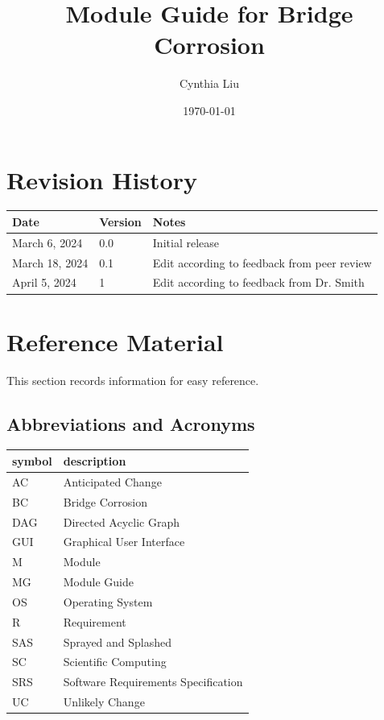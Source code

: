 \documentclass[12pt, titlepage]{article}
\begin{document}
\title{Module Guide for Bridge Corrosion} 
\author{Cynthia Liu}
\date{\today}

\maketitle


\section{Revision History}

\begin{tabularx}{\textwidth}{p{3cm}p{2cm}X}
\toprule {\bf Date} & {\bf Version} & {\bf Notes}\\
\midrule
March 6, 2024 & 0.0 & Initial release\\
March 18, 2024 & 0.1 & Edit according to feedback from peer review \\
April 5, 2024 & 1 & Edit according to feedback from Dr. Smith\\
\bottomrule
\end{tabularx}

\newpage

\section{Reference Material}

This section records information for easy reference.

\subsection{Abbreviations and Acronyms}

\renewcommand{\arraystretch}{1.2}
\begin{tabular}{l l} 
  \toprule		
  \textbf{symbol} & \textbf{description}\\
  \midrule 
  AC & Anticipated Change\\
  BC & Bridge Corrosion\\
  DAG & Directed Acyclic Graph \\
  GUI & Graphical User Interface \\
  M & Module \\
  MG & Module Guide \\
  OS & Operating System \\
  R & Requirement\\
  SAS & Sprayed and Splashed \\
  SC & Scientific Computing \\
  SRS & Software Requirements Specification\\
  UC & Unlikely Change \\
  \bottomrule
\end{tabular}\\
\end{document}
